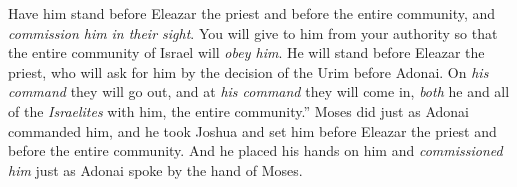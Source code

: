 \begin{biblechapter}
\verse Have him stand before Eleazar the priest and before the entire community, and \textit{commission him} \textit{in their sight}.
\verse You will give to him from your authority so that the entire community of Israel will \textit{obey him}.
\verse He will stand before Eleazar the priest, who will ask for him by the decision of the Urim before Adonai. On \textit{his command} they will go out, and at \textit{his command} they will come in, \textit{both} he and all of the \textit{Israelites} with him, the entire community.”
\verse Moses did just as Adonai commanded him, and he took Joshua and set him before Eleazar the priest and before the entire community.
\verse And he placed his hands on him and \textit{commissioned him} just as Adonai spoke by the hand of Moses.
\end{biblechapter}

